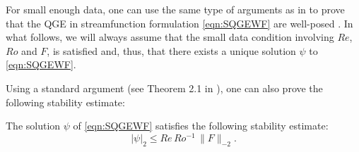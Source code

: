 For small enough data, one can use the same type of arguments as in \cite{Girault79,Girault86} to
prove that the QGE in streamfunction formulation \eqref{eqn:SQGEWF} are well-posed
\cite{Barcilon,Ipatova10,Wolansky88}.
In what follows, we will always assume that the small data condition involving $Re$, $Ro$ and $F$, is satisfied and, thus, that there exists a unique solution $\psi$ to \eqref{eqn:SQGEWF}.

Using a standard argument (see Theorem 2.1 in \cite{Cayco86}), one can also prove the following stability estimate:
\begin{theorem} \label{thm:stability_sqge}
The solution $\psi$ of \eqref{eqn:SQGEWF} satisfies the following stability estimate:
 \begin{equation}
   |\psi|_2 
   \le Re \, Ro^{-1} \, \| F \|_{-2} . 
   \label{eqn:stability_sqge}
 \end{equation}
\end{theorem}
